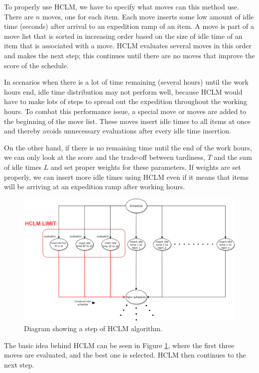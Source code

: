 \documentclass{ctuthesis}
\begin{document}
To properly use HCLM, we have to specify what moves can this method use. 
There are $n$ moves, one for each item. Each move inserts some low amount of idle time (seconds) after arrival to an expedition ramp of an item. A move is part of a move list that is sorted in increasing order based on the size of idle time of an item that is associated with a move. HCLM evaluates several moves in this order and makes the next step; this continues until there are no moves that improve the score of the schedule.

 
In scenarios when there is a lot of time remaining (several hours) until the work hours end, idle time distribution may not perform well, because HCLM would have to make lots of steps to spread out the expedition throughout the working hours. To combat this performance issue, a special move or moves are added to the beginning of the move list. These moves insert idle times to all items at once and thereby avoids unnecessary evaluations after every idle time insertion.

On the other hand, if there is no remaining time until the end of the work hours, we can only look at the score and the trade-off between tardiness, $T$ and the sum of idle times $L$ and set proper weights for these parameters. If weights are set properly, we can insert more idle times using HCLM even if it means that items will be arriving at an expedition ramp after working hours.

 \begin{figure}[H]
\includegraphics[width=1\linewidth]{HCLM.png}
\caption{Diagram showing a step of HCLM algorithm.}
\label{fig:hclm}
\end{figure}

 The basic idea behind HCLM can be seen in Figure \ref{fig:hclm}, where the first three moves are evaluated, and the best one is selected. HCLM then continues to the next step. 
 
\end{document}

